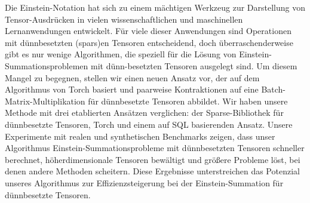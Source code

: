 Die Einstein-Notation hat sich zu einem mächtigen Werkzeug zur Darstellung von Tensor-Ausdrücken in vielen
wissenschaftlichen und maschinellen Lernanwendungen entwickelt. Für viele dieser Anwendungen sind
Operationen mit dünnbesetzten (spars)en Tensoren entscheidend, doch überraschenderweise gibt es nur
wenige Algorithmen, die speziell für die Lösung von Einstein-Summationsproblemen mit dünn-besetzten
Tensoren ausgelegt sind. Um diesem Mangel zu begegnen, stellen wir einen neuen Ansatz vor, der auf dem
Algorithmus von Torch basiert und paarweise Kontraktionen auf eine Batch-Matrix-Multiplikation für
dünnbesetzte Tensoren abbildet. Wir haben unsere Methode mit drei etablierten Ansätzen verglichen: der
Sparse-Bibliothek für dünnbesetzte Tensoren, Torch und einem auf SQL basierenden Ansatz. Unsere Experimente
mit realen und synthetischen Benchmarks zeigen, dass unser Algorithmus Einstein-Summationsprobleme mit
dünnbesetzten Tensoren schneller berechnet, höherdimensionale Tensoren bewältigt und größere Probleme löst,
bei denen andere Methoden scheitern. Diese Ergebnisse unterstreichen das Potenzial unseres Algorithmus
zur Effizienzsteigerung bei der Einstein-Summation für dünnbesetzte Tensoren.